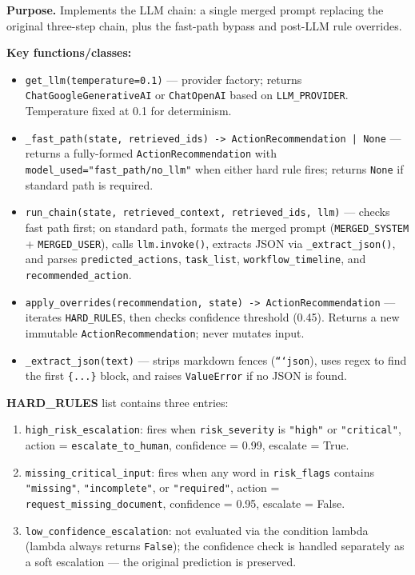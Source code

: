 \documentclass[12pt,a4paper]{article}
\begin{document}
\textbf{Purpose.} Implements the LLM chain: a single merged prompt replacing the
original three-step chain, plus the fast-path bypass and post-LLM rule overrides.

\textbf{Key functions/classes:}
\begin{itemize}[nosep]
  \item \texttt{get\_llm(temperature=0.1)} --- provider factory; returns
    \texttt{ChatGoogleGenerativeAI} or \texttt{ChatOpenAI} based on \texttt{LLM\_PROVIDER}.
    Temperature fixed at 0.1 for determinism.
  \item \texttt{\_fast\_path(state, retrieved\_ids) -> ActionRecommendation | None} ---
    returns a fully-formed \texttt{ActionRecommendation} with
    \texttt{model\_used="fast\_path/no\_llm"} when either hard rule fires; returns
    \texttt{None} if standard path is required.
  \item \texttt{run\_chain(state, retrieved\_context, retrieved\_ids, llm)} ---
    checks fast path first; on standard path, formats the merged prompt
    (\texttt{MERGED\_SYSTEM} + \texttt{MERGED\_USER}), calls \texttt{llm.invoke()},
    extracts JSON via \texttt{\_extract\_json()}, and parses
    \texttt{predicted\_actions}, \texttt{task\_list}, \texttt{workflow\_timeline},
    and \texttt{recommended\_action}.
  \item \texttt{apply\_overrides(recommendation, state) -> ActionRecommendation} ---
    iterates \texttt{HARD\_RULES}, then checks confidence threshold (0.45).
    Returns a new immutable \texttt{ActionRecommendation}; never mutates input.
  \item \texttt{\_extract\_json(text)} --- strips markdown fences (\texttt{```json}),
    uses regex to find the first \texttt{\{...\}} block, and raises \texttt{ValueError}
    if no JSON is found.
\end{itemize}

\textbf{HARD\_RULES} list contains three entries:
\begin{enumerate}[nosep]
  \item \texttt{high\_risk\_escalation}: fires when \texttt{risk\_severity} is
    \texttt{"high"} or \texttt{"critical"}, action = \texttt{escalate\_to\_human},
    confidence = 0.99, escalate = True.
  \item \texttt{missing\_critical\_input}: fires when any word in
    \texttt{risk\_flags} contains \texttt{"missing"}, \texttt{"incomplete"}, or
    \texttt{"required"}, action = \texttt{request\_missing\_document},
    confidence = 0.95, escalate = False.
  \item \texttt{low\_confidence\_escalation}: not evaluated via the condition lambda
    (lambda always returns \texttt{False}); the confidence check is handled separately
    as a soft escalation --- the original prediction is preserved.
\end{enumerate}
\end{document}
